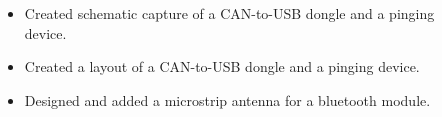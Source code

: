 \documentclass[10pt,a4paper,ragged2e,withhyper]{altacv}
\begin{document}
\begin{paracol}{2}

\begin{itemize}
    \item Created schematic capture of a CAN-to-USB dongle and a pinging \\device.
    \item Created a layout of a CAN-to-USB dongle and a pinging device.
    \item Designed and added a microstrip antenna for a bluetooth module.
\end{itemize}






\end{paracol}
\end{document}
